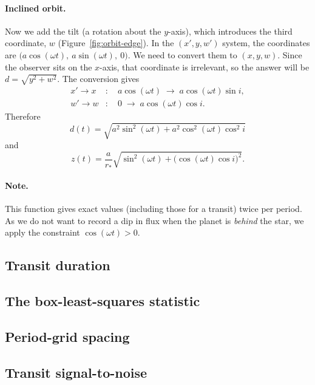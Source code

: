 \documentclass[11pt,a4paper]{article}
\begin{document}
\paragraph{Inclined orbit.}
Now we add the tilt (a rotation about the $y$-axis), which introduces the
third coordinate, $w$ (Figure~\ref{fig:orbit-edge}). In the
$(x', y, w')$ system, the coordinates are
$\bigl(a\cos(\omega t),\ a\sin(\omega t),\ 0\bigr)$. We need to convert them to
$(x, y, w)$. Since the observer sits on the $x$-axis, that coordinate is
irrelevant, so the answer will be $d = \sqrt{y^2 + w^2}$. The conversion gives
\begin{align}
  x' \to x &: \quad a\cos(\omega t) \;\to\; a\cos(\omega t)\sin i, \\
  w' \to w &: \quad 0 \;\to\; a\cos(\omega t)\cos i .
\end{align}
Therefore
\begin{equation}
  d(t) = \sqrt{a^2 \sin^2(\omega t) + a^2 \cos^2(\omega t)\cos^2 i}
\end{equation}
and
\begin{equation}
  z(t) = \frac{a}{r_*}\sqrt{\sin^2(\omega t) + \bigl(\cos(\omega t)\cos i\bigr)^2}.
\end{equation}

\paragraph{Note.}
This function gives exact values (including those for a transit) twice per
period. As we do not want to record a dip in flux when the planet is
\emph{behind} the star, we apply the constraint $\cos(\omega t) > 0$.

\subsection{Transit duration}
\label{sec:app-duration}

\subsection{The box-least-squares statistic}
\label{sec:app-bls}

\subsection{Period-grid spacing}
\label{sec:app-grid}

\subsection{Transit signal-to-noise}
\label{sec:app-snr}
\end{document}
